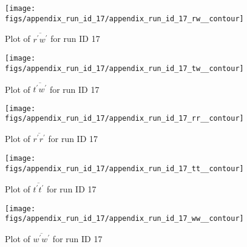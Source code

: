 \begin{figure}[H]
\centering
\texttt{[image: figs/appendix\_run\_id\_17/appendix\_run\_id\_17\_rw\_\_contour]}
\caption{Plot of $\overline{r^\prime w^\prime}$ for run ID 17}
\label{fig:appendix_run_id_17_rw__contour}
\end{figure}


\begin{figure}[H]
\centering
\texttt{[image: figs/appendix\_run\_id\_17/appendix\_run\_id\_17\_tw\_\_contour]}
\caption{Plot of $\overline{t^\prime w^\prime}$ for run ID 17}
\label{fig:appendix_run_id_17_tw__contour}
\end{figure}


\begin{figure}[H]
\centering
\texttt{[image: figs/appendix\_run\_id\_17/appendix\_run\_id\_17\_rr\_\_contour]}
\caption{Plot of $\overline{r^\prime r^\prime}$ for run ID 17}
\label{fig:appendix_run_id_17_rr__contour}
\end{figure}


\begin{figure}[H]
\centering
\texttt{[image: figs/appendix\_run\_id\_17/appendix\_run\_id\_17\_tt\_\_contour]}
\caption{Plot of $\overline{t^\prime t^\prime}$ for run ID 17}
\label{fig:appendix_run_id_17_tt__contour}
\end{figure}


\begin{figure}[H]
\centering
\texttt{[image: figs/appendix\_run\_id\_17/appendix\_run\_id\_17\_ww\_\_contour]}
\caption{Plot of $\overline{w^\prime w^\prime}$ for run ID 17}
\label{fig:appendix_run_id_17_ww__contour}
\end{figure}


